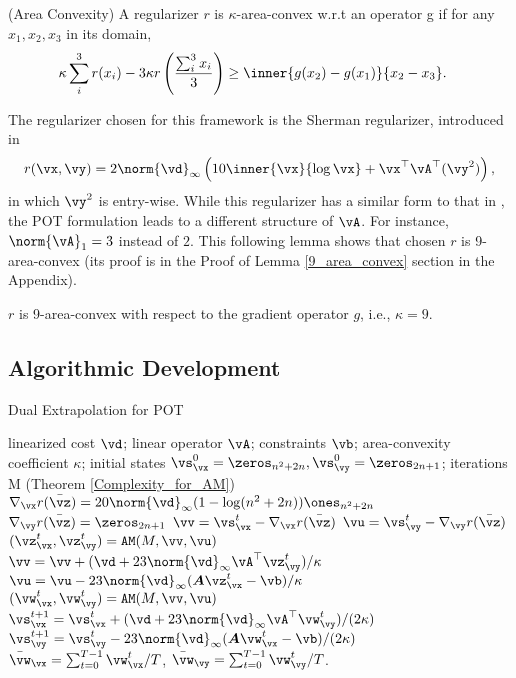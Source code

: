 \begin{definition}
    \label{defn:area_convex}
    (Area Convexity) A regularizer $r$ is $\kappa$-area-convex w.r.t an operator g if for any $x_1, x_2, x_3$ in its domain,
    \begin{align*}
        &\kappa \sum_{i}^3 r(x_i) - 3\kappa r \left(\frac{\sum_{i}^3 x_i}{3}\right) \geq \inner{g(x_2)- g(x_1)}{x_2-x_3}.
    \end{align*}
\end{definition}
The regularizer chosen for this framework is the Sherman regularizer, introduced in \citep{Sherman-2017-Area}
\begin{equation} \label{regularizer}
    r(\vx,\vy) = 2 \norm{\vd}_\infty \left( 10 \inner{\vx}{\log{\vx}} + \vx^\top \vA^\top (\vy^2) \right),
\end{equation}
in which $\vy^2$ is entry-wise. While this regularizer has a similar form to that in \citep{Jambulapati-2019-Direct}, the POT formulation leads to a different structure of $\vA$. For instance, $\norm{\vA}_1 = 3$ instead of $2$. This following lemma shows that chosen $r$ is 9-area-convex (its proof is in the Proof of Lemma \ref{9_area_convex} section in the Appendix).
\begin{lemma} \label{9_area_convex}
    $r$ is 9-area-convex with respect to the gradient operator $g$, i.e., $\kappa = 9$.
\end{lemma}

\subsection{Algorithmic Development}

\begin{algorithm}[t]
    \caption{Dual Extrapolation for POT}
    \label{alg:Dual_Extrapolation_POT}
    \begin{algorithmic}[1]
    \REQUIRE linearized cost $\vd$; linear operator $\vA$; constraints $\vb$; area-convexity coefficient $\kappa$; initial states \(\vs^0_{\vx} = \zeros_{n^2+2n}, \vs^0_{\vy} = \zeros_{2n+1}\); iterations M (Theorem \ref{Complexity_for_AM})
    \STATE \(\nabla_\vx r(\bar{\vz}) = 20 \norm{
    \vd}_\infty (1 - \log(n^2+2n)) \ones_{n^2 +2n}\)
    \STATE \(\nabla_\vy r(\bar\vz) = \zeros_{2n+1}\)
        \STATE \(\vv = \vs^t_{\vx} - \nabla_\vx r(\bar{\vz})\)
         \STATE \(\vu =  \vs^t_{\vy} - \nabla_\vy r(\bar{\vz})\)
        \STATE \( (\vz_\vx^t, \vz_\vy^t) = \mathtt{AM}(M, \vv, \vu)\) 
        \STATE \(\vv = \vv + (\vd + 23 \norm{\vd}_\infty \vA^\top \vz^t_{\vy}) / \kappa\) 
        \STATE \(\vu = \vu - 23 \norm{\vd}_\infty ( \boldsymbol A \vz_{\vx}^t - \vb) / \kappa\) 
        \STATE \( (\vw_{\vx}^t, \vw_{\vy}^t) = \mathtt{AM}(M, \vv, \vu)\)
        \STATE \(\vs^{t+1}_\vx = \vs^t_\vx + (\vd + 23 \norm{\vd}_\infty \vA^\top \vw_{\vy}^t) / (2 \kappa) \)
         \STATE \(\vs^{t+1}_{\vy} = \vs^{t}_{\vy} - 23 \norm{\vd}_\infty( \boldsymbol A \vw_{\vx}^t -\vb) / (2 \kappa) \)
    \ENDFOR
    \ENSURE 
        $ \bar{\vw}_{\vx} = \sum_{t=0}^{T-1} \vw_{\vx}^{t} / T$, $\bar{\vw}_{\vy} = \sum_{t=0}^{T-1} \vw_{\vy}^{t} / T$.
    \end{algorithmic}
\end{algorithm}

